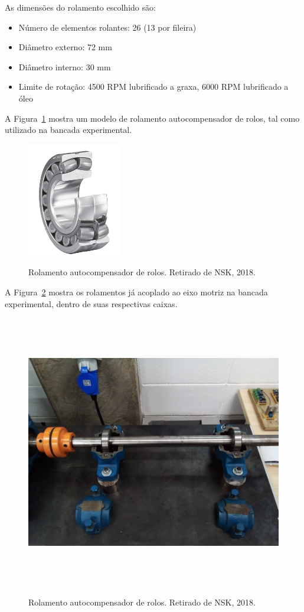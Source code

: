 \documentclass[
	12pt,				
	oneside,			
	a4paper,			
	english,			
	brazil,	
	sumario=abnt-6027-2012		
	]{abntex2ppgsi}
\begin{document}
As dimensões do rolamento escolhido são:

\begin{itemize}
	\item Número de elementos rolantes: 26 (13 por fileira)
	\item Diâmetro externo: 72 \si{\mm}
	\item Diâmetro interno: 30 \si{\mm}
	\item Limite de rotação: 4500 RPM lubrificado a graxa, 6000 RPM lubrificado a óleo
\end{itemize}

A Figura~\ref{Figura24} mostra um modelo de rolamento autocompensador de rolos, tal como utilizado na bancada experimental.

\begin{figure}[H]
\centering
\caption {Rolamento autocompensador de rolos. Retirado de NSK, 2018.}
\includegraphics[width=\textwidth,height=50mm,keepaspectratio]{Figura24}
\label{Figura24}
\end{figure} 

A Figura~\ref{rolamento_caixa_aberta} mostra os rolamentos já acoplado ao eixo motriz na bancada experimental, dentro de suas respectivas caixas.

\begin{figure}[H]
\centering
\caption {Rolamento autocompensador de rolos. Retirado de NSK, 2018.}
\includegraphics[width=\textwidth,height=120mm,keepaspectratio]{rolamento_caixa_aberta}
\label{rolamento_caixa_aberta}
\end{figure} 
\end{document}
